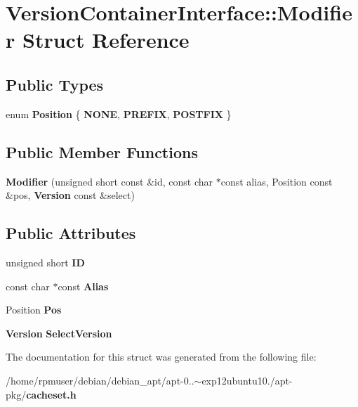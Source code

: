 \section{\-Version\-Container\-Interface\-:\-:\-Modifier \-Struct \-Reference}
\label{structAPT_1_1VersionContainerInterface_1_1Modifier}
\subsection*{\-Public \-Types}
\begin{DoxyCompactItemize}
\item 
enum {\bfseries \-Position} \{ {\bfseries \-N\-O\-N\-E}, 
{\bfseries \-P\-R\-E\-F\-I\-X}, 
{\bfseries \-P\-O\-S\-T\-F\-I\-X}
 \}
\end{DoxyCompactItemize}
\subsection*{\-Public \-Member \-Functions}
\begin{DoxyCompactItemize}
\item 
{\bfseries \-Modifier} (unsigned short const \&id, const char $\ast$const alias, \-Position const \&pos, {\bf \-Version} const \&select)\label{structAPT_1_1VersionContainerInterface_1_1Modifier_a2a8442b22bf18b4fd889e5e827908499}

\end{DoxyCompactItemize}
\subsection*{\-Public \-Attributes}
\begin{DoxyCompactItemize}
\item 
unsigned short {\bfseries \-I\-D}\label{structAPT_1_1VersionContainerInterface_1_1Modifier_a079e9ceeace88427313caef809d32dee}

\item 
const char $\ast$const {\bfseries \-Alias}\label{structAPT_1_1VersionContainerInterface_1_1Modifier_a5c49213c5e29a65db2a3378b543ca7d3}

\item 
\-Position {\bfseries \-Pos}\label{structAPT_1_1VersionContainerInterface_1_1Modifier_ab6c2931d7066526de7ed805cc1f7d90c}

\item 
{\bf \-Version} {\bfseries \-Select\-Version}\label{structAPT_1_1VersionContainerInterface_1_1Modifier_ac041f241849576c529e338673f7c6246}

\end{DoxyCompactItemize}


\-The documentation for this struct was generated from the following file\-:\begin{DoxyCompactItemize}
\item 
/home/rpmuser/debian/debian\-\_\-apt/apt-\/0..$\sim$exp12ubuntu10./apt-\/pkg/{\bf cacheset.\-h}\end{DoxyCompactItemize}
